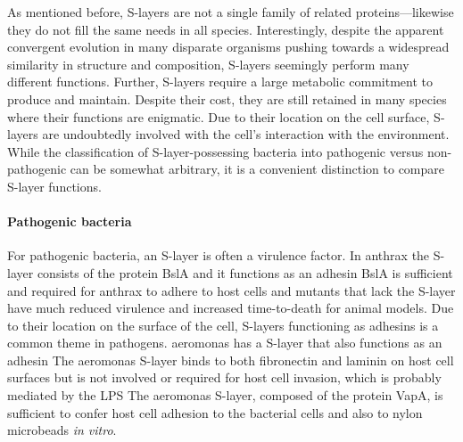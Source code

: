   As mentioned before, \acp{S-layer} are not a single family of related proteins---likewise they do not fill the same needs in all species. Interestingly, despite the apparent convergent evolution in many disparate organisms pushing towards a widespread similarity in structure and composition, \acp{S-layer} seemingly perform many  different functions. Further, \acp{S-layer} require a large metabolic commitment to produce and maintain. Despite their cost, they are still retained in many species where their functions are enigmatic. Due to their location on the cell surface, \acp{S-layer} are undoubtedly involved with the cell's interaction with the environment. While the classification of \ac{S-layer}-possessing bacteria into pathogenic versus non-pathogenic can be somewhat arbitrary, it is a convenient distinction to compare \ac{S-layer} functions. 
  
  \paragraph{Pathogenic bacteria} For pathogenic bacteria, an \ac{S-layer} is often a virulence factor. In \acl{anthrax} the \ac{S-layer} consists of the protein BslA and it functions as an adhesin BslA is sufficient and required for \ac{anthrax} to adhere to host cells and mutants that lack the \ac{S-layer} have much reduced virulence and increased time-to-death for animal models. Due to their location on the surface of the cell, \acp{S-layer} functioning as adhesins is a common theme in pathogens. \ac{aeromonas} has a \ac{S-layer} that also functions as an adhesin The \ac{aeromonas} \ac{S-layer} binds to both fibronectin and laminin on host cell surfaces but is not involved or required for host cell invasion, which is probably mediated by the \ac{LPS}
  The \ac{aeromonas} \ac{S-layer}, composed of the protein VapA, is sufficient to confer host cell adhesion to the bacterial cells and also to nylon microbeads \textit{in vitro}. 

